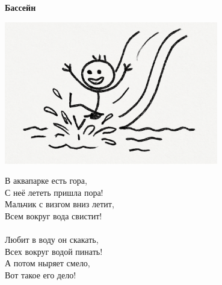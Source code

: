 \vspace*{\fill}
\begin{center}
  {\huge\textbf{Бассейн}}

  \vspace{1.5em}  \includegraphics[width=0.7\textwidth]{pictures/basseyn.png}
  \vspace{4em}
  \parbox{0.6\textwidth}{
    \LARGE
    \begin{spacing}{1.2}
      В аквапарке есть гора,\\
      С неё лететь пришла пора!\\
      Мальчик с визгом вниз летит,\\
      Всем вокруг вода свистит!\\
      \\
      Любит в воду он скакать,\\
      Всех вокруг водой пинать!\\
      А потом ныряет смело,\\
      Вот такое его дело! %
    \end{spacing}
    
  }
\end{center}
\vspace*{\fill}